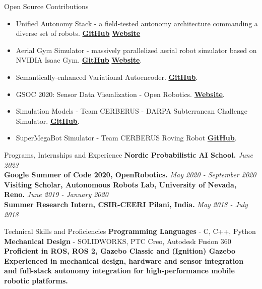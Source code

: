\documentclass{resume} %
\begin{document}
\begin{rSection}{Open Source Contributions}
\begin{itemize}
    \item Unified Autonomy Stack - a field-tested autonomy architecture commanding a diverse set of robots. \href{https://github.com/ntnu-arl/unified_autonomy_stack}{\textbf{GitHub}} \href{https://ntnu-arl.github.io/unified_autonomy_stack}{\textbf{Website}}
    \item Aerial Gym Simulator - massively parallelized aerial robot simulator based on NVIDIA Isaac Gym. \href{https://github.com/ntnu-arl/aerial_gym_simulator}{\textbf{GitHub}} \href{https://ntnu-arl.github.io/aerial_gym_simulator}{\textbf{Website}}.
    \item Semantically-enhanced Variational Autoencoder. \href{https://github.com/ntnu-arl/sevae}{\textbf{GitHub}}.
    \item GSOC 2020: Sensor Data Visualization - Open Robotics. \href{https://community.gazebosim.org/t/gsoc-2020-sensor-data-visualization/638}{\textbf{Website}}.
    \item Simulation Models - Team CERBERUS - DARPA Subterranean Challenge Simulator. \href{https://github.com/osrf/subt/tree/final_event/submitted_models}{\textbf{GitHub}}.
    \item SuperMegaBot Simulator - Team CERBERUS Roving Robot \href{https://github.com/ntnu-arl/smb_simulator}{\textbf{GitHub}}.
\end{itemize} 
\end{rSection}




\begin{rSection}{Programs, Internships and Experience}
\small{{{\bf Nordic Probabilistic AI School.} \hfill \small{{\em June 2023}}}}\\
\small{{{\bf Google Summer of Code 2020, OpenRobotics.} \hfill \small{{\em May 2020 - September 2020}}}}\\
\small{{\bf Visiting Scholar, Autonomous Robots Lab, University of Nevada, Reno.} \hfill \small{{\em June 2019 - January 2020}}}\\
{\bf Summer Research Intern, CSIR-CEERI Pilani, India.} \hfill \small{{\em May 2018 - July 2018}}
\end{rSection}

\begin{rSection}{Technical Skills and Proficiencies}
{\bf{Programming Languages}} - C, C++, Python\\
{\bf{Mechanical Design}} - SOLIDWORKS, PTC Creo, Autodesk Fusion 360\\
{\bf{Proficient in ROS, ROS 2, Gazebo Classic and (Ignition) Gazebo}}\\
{\bf{Experienced in mechanical design, hardware and sensor integration and full-stack autonomy integration for high-performance mobile robotic platforms.}}
\end{rSection}
\end{document}
